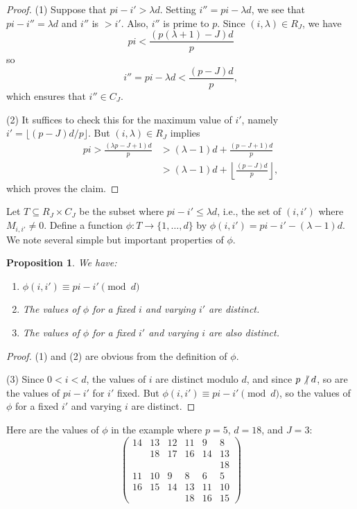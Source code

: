 \documentclass[12pt,reqno]{amsart}
\numberwithin{equation}{section}
\theoremstyle{plain}
\newtheorem{prop}[subsection]{Proposition}
\theoremstyle{definition}
\theoremstyle{remark}
\numberwithin{equation}{section}
\newcommand{\<}{\langle}
\renewcommand{\>}{\rangle}
\newcommand{\nodiv}{\not|}
\def\nodiv{\mathrel{\mathchoice{\not|}{\not|}{\kern-.2em\not\kern.2em|}
{\kern-.2em\not\kern.2em|}}}
\begin{document}
\begin{proof}
(1) Suppose that $pi-i'>\lambda d$.
Setting $i''=pi-\lambda d$, we see that $pi-i''=\lambda d$ and 
$i''$ is $>i'$.  Also, $i''$ is prime to $p$.  Since $(i,\lambda)\in
R_J$, we have
  \[pi<\frac{(p(\lambda+1)-J)d}{p}\]
  so
  \[i''=pi-\lambda d<\frac{(p-J)d}{p},\]
  which ensures that $i''\in C_J$.

(2) It suffices to check this for the maximum value of
$i'$, namely $i'=\lfloor(p-J)d/p\rfloor$.  But $(i,\lambda)\in R_J$ implies
\begin{align*}
pi>\frac{(\lambda p-J+1)d}{p}&>(\lambda-1)d+\frac{(p-J+1)d}{p}\\
    &>(\lambda-1)d+\left\lfloor\frac{(p-J)d}{p}\right\rfloor,    
\end{align*}
which proves the claim.
\end{proof}


Let $T\subseteq R_J\times C_J$ be the subset where $pi-i'\le\lambda d$,
i.e., the set of $(i,i')$ where $M_{i,i'}\neq0$.  Define a function
$\phi:T\to\{1,\dots,d\}$ by $\phi(i,i')=pi-i'-(\lambda-1)d$.  We note
several simple but important properties of $\phi$.

\begin{prop}\label{prop:phi}
  We have:
  \begin{enumerate}
  \item $\phi(i,i')\equiv pi-i'\pmod d$
  \item The values of $\phi$ for a fixed $i$ and varying $i'$ are
    distinct.
  \item The values of $\phi$ for a fixed $i'$ and varying $i$ are also
    distinct.
  \end{enumerate}
\end{prop}

\begin{proof}\mbox{}
  (1) and (2) are obvious from the definition of $\phi$.

  (3) Since $0<i<d$, the values of $i$ are distinct modulo $d$, and
  since $p\nodiv d$, so are the values of $pi-i'$ for $i'$ fixed.  But
  $\phi(i,i')\equiv pi-i'\pmod d$, so the values of $\phi$ for a fixed
  $i'$ and varying $i$ are distinct.
\end{proof}

Here are the values of $\phi$ in the example where $p=5$, $d=18$, and
$J=3$:
\[\begin{pmatrix}
14&13&12&11&9&8\\
&18&17&16&14&13\\
&&&&&18\\
11&10&9&8&6&5\\
16&15&14&13&11&10\\
&&&18&16&15
\end{pmatrix}
\]
\end{document}
